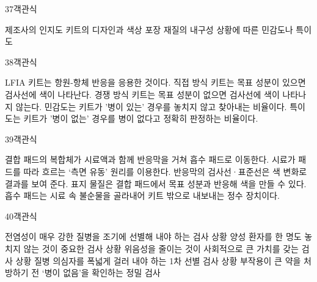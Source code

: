 \documentclass[fs9,seriesRus]{korfarm-base}
\begin{document}
\begin{kfQBlock}{37}{객관식}
\begin{kfChoices}
\kfChoice 제조사의 인지도
\kfChoice 키트의 디자인과 색상
\kfChoice 포장 재질의 내구성
\kfChoice 상황에 따른 민감도나 특이도
\end{kfChoices}
\end{kfQBlock}
\begin{kfQBlock}{38}{객관식}
\begin{kfChoices}
\kfChoice LFIA 키트는 항원-항체 반응을 응용한 것이다.
\kfChoice 직접 방식 키트는 목표 성분이 있으면 검사선에 색이 나타난다.
\kfChoice 경쟁 방식 키트는 목표 성분이 없으면 검사선에 색이 나타나지 않는다.
\kfChoice 민감도는 키트가 '병이 있는' 경우를 놓치지 않고 찾아내는 비율이다.
\kfChoice 특이도는 키트가 '병이 없는' 경우를 병이 없다고 정확히 판정하는 비율이다.
\end{kfChoices}
\end{kfQBlock}
\begin{kfQBlock}{39}{객관식}
\begin{kfChoices}
\kfChoice 결합 패드의 복합체가 시료액과 함께 반응막을 거쳐 흡수 패드로 이동한다.
\kfChoice 시료가 패드를 따라 흐르는 ‘측면 유동’ 원리를 이용한다.
\kfChoice 반응막의 검사선·표준선은 색 변화로 결과를 보여 준다.
\kfChoice 표지 물질은 결합 패드에서 목표 성분과 반응해 색을 만들 수 있다.
\kfChoice 흡수 패드는 시료 속 불순물을 골라내어 키트 밖으로 내보내는 정수 장치이다.
\end{kfChoices}
\end{kfQBlock}
\begin{kfQBlock}{40}{객관식}
\begin{kfChoices}
\kfChoice 전염성이 매우 강한 질병을 조기에 선별해 내야 하는 검사 상황
\kfChoice 양성 환자를 한 명도 놓치지 않는 것이 중요한 검사 상황
\kfChoice 위음성을 줄이는 것이 사회적으로 큰 가치를 갖는 검사 상황
\kfChoice 질병 의심자를 폭넓게 걸러 내야 하는 1차 선별 검사 상황
\kfChoice 부작용이 큰 약을 처방하기 전 ‘병이 없음’을 확인하는 정밀 검사
\end{kfChoices}
\end{kfQBlock}
\end{document}
